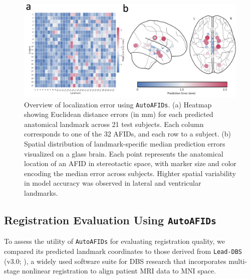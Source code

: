 \begin{figure}[hbt!]
    \centering
    \includegraphics[width=1\linewidth]{figs/ch3_Figure_autoscore.png}
    \caption{Overview of localization error using \texttt{AutoAFIDs}. (a) Heatmap showing Euclidean distance errors (in mm) for each predicted anatomical landmark across 21 test subjects. Each column corresponds to one of the 32 AFIDs, and each row to a subject. (b) Spatial distribution of landmark-specific median prediction errors visualized on a glass brain. Each point represents the anatomical location of an AFID in stereotactic space, with marker size and color encoding the median error across subjects. Highter spatial variability in model accuracy was observed in lateral and ventricular landmarks.}
    \label{fig:ch3_Figure_autoscore}
\end{figure}

\subsection{Registration Evaluation Using \texttt{AutoAFIDs}}
To assess the utility of \texttt{AutoAFIDs} for evaluating registration quality, we compared its predicted landmark coordinates to those derived from \texttt{Lead-DBS} (v3.0; \cite{Neudorfer2023-wd}), a widely used software suite for DBS research that incorporates multi-stage nonlinear registration to align patient MRI data to MNI space. 

